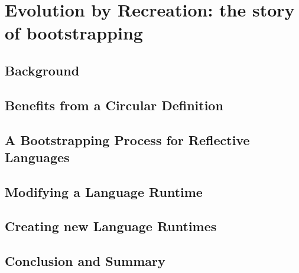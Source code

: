 
\chapter{Evolution by Recreation: the story of bootstrapping}
\minitoc
\introduction


\section{Background}

\section{Benefits from a Circular Definition}

\section{A Bootstrapping Process for Reflective Languages}

\section{Modifying a Language Runtime}

\section{Creating new Language Runtimes}

\section{Conclusion and Summary}


